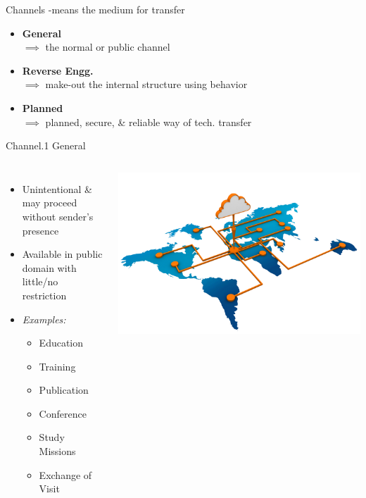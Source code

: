 \begin{frame}{Channels}
-means the medium for transfer
\begin{itemize}
	\item \textbf{General}
	\\ $\implies$ the normal or public channel
	\item \textbf{Reverse Engg.}
	\\ $\implies$ make-out the internal structure using behavior
	\item \textbf{Planned}
	\\ $\implies$ planned, secure, \& reliable way of tech. transfer
\end{itemize}
\end{frame}

\begin{frame}{Channel.1 General}
\begin{columns}
\begin{itemize}
	\item Unintentional \& may proceed without sender's presence
	\item Available in public domain with little/no restriction
	\item \textit{Examples: }
	\begin{itemize}
		\item Education
		\item Training
		\item Publication
		\item Conference
		\item Study Missions
		\item Exchange of Visit
	\end{itemize}
\end{itemize}
\includegraphics[width=\textwidth]{img/globalNetwork.png}
\end{columns}
\end{frame}

